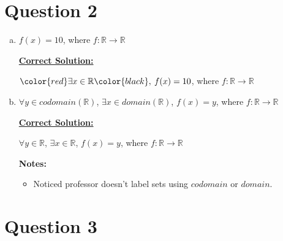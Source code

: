 \documentclass[12pt]{article}
\begin{document}
\section*{Question 2}
\begin{enumerate}[a.]
    \item

    $f(x) = 10$, where $f:\mathbb{R} \to \mathbb{R}$

    \bigskip

    \begin{mdframed}
        \underline{\textbf{Correct Solution:}}

        \bigskip

        $\color{red}\exists x \in \mathbb{R}\color{black},\:f(x) = 10$, where $f:\mathbb{R} \to \mathbb{R}$

    \end{mdframed}

    \item

    $\forall y \in codomain(\mathbb{R})$, $\exists x \in domain(\mathbb{R})$, $f(x) = y$, where $f:\mathbb{R} \to \mathbb{R}$

    \bigskip

    \begin{mdframed}
        \underline{\textbf{Correct Solution:}}

        \bigskip

        \color{red}$\forall y \in \mathbb{R}$, $\exists x \in \mathbb{R}$\color{black}, $f(x) = y$, where $f:\mathbb{R} \to \mathbb{R}$

    \end{mdframed}

    \bigskip

    \textbf{Notes:}

    \begin{itemize}
        \item Noticed professor doesn't label sets using $codomain$ or $domain$.
    \end{itemize}

\end{enumerate}

\section*{Question 3}
\end{document}
